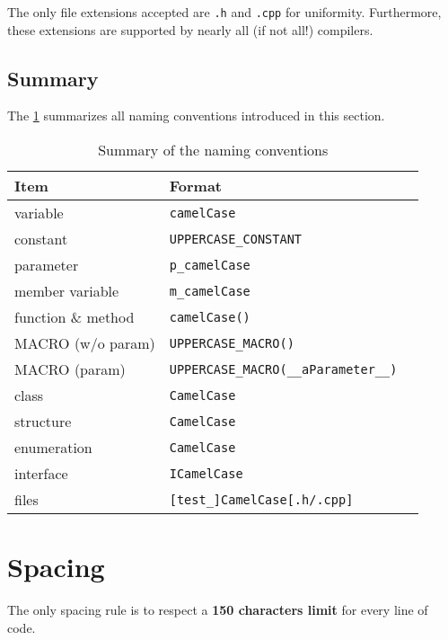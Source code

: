 \clearpage

  
The only file extensions accepted are \texttt{.h} and \texttt{.cpp} for 
uniformity. Furthermore, these extensions are supported by nearly all (if not 
all!) compilers.
  
\clearpage
  
\subsection{Summary}

The \cref{tblNamingConventions} summarizes all naming conventions introduced in 
this section.

\begin{table}[H]
  \begin{tabular}{|l|l|l|}
    \hline
    \textbf{Item}              & \textbf{Format}                              \\
    \hline\hline
    variable                   & \texttt{camelCase}                           \\
    constant                   & \texttt{UPPERCASE\_CONSTANT}                 \\
    parameter                  & \texttt{p\_camelCase}                        \\
    member variable            & \texttt{m\_camelCase}                        \\
    function \& method         & \texttt{camelCase()}                         \\
    MACRO (w/o param)          & \texttt{UPPERCASE\_MACRO()}                  \\
    MACRO (param)              & \texttt{UPPERCASE\_MACRO(\_\_aParameter\_\_)}\\
    class                      & \texttt{CamelCase}                           \\
    structure                  & \texttt{CamelCase}                           \\
    enumeration                & \texttt{CamelCase}                           \\
    interface                  & \texttt{ICamelCase}                          \\
    files                      & \texttt{[test\_]CamelCase[.h/.cpp]}          \\
    \hline
  \end{tabular} 
  \caption{Summary of the naming conventions}
  \label{tblNamingConventions}
\end{table} 

\section{Spacing}

The only spacing rule is to respect a \textbf{150 characters limit} for every
line of code.